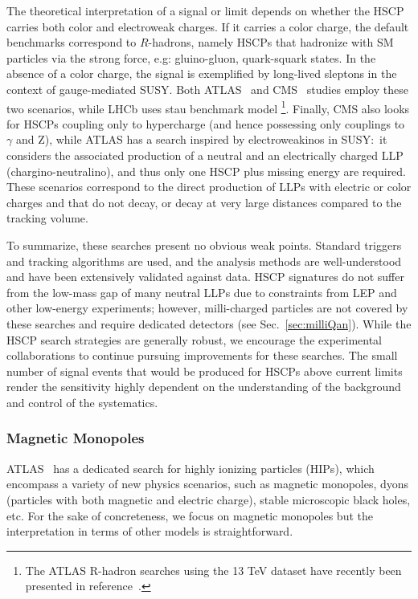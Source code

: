The theoretical interpretation of a signal or limit depends on whether the HSCP carries both color and electroweak charges. If it carries a color charge, the default benchmarks correspond to $R$-hadrons, namely HSCPs that hadronize with SM particles via the strong force, e.g: gluino-gluon, quark-squark states. In the absence of a color charge, the signal is exemplified by long-lived sleptons in the context of gauge-mediated SUSY. Both ATLAS~\cite{ATLAS:2014fka} and CMS~\cite{CMS:2016ybj} studies employ these two scenarios, while LHCb \cite{Aaij:2015ica} uses stau benchmark model \footnote{The ATLAS R-hadron searches using the 13 TeV dataset have recently been presented in reference~\cite{Aaboud:2016uth}. }.
Finally, CMS also looks for HSCPs coupling only to hypercharge (and hence possessing only couplings to $\gamma$ and Z), while ATLAS has a search inspired by electroweakinos in SUSY:~it considers the associated production of a neutral and an electrically charged LLP (chargino-neutralino), and thus only one HSCP plus missing energy are required. These scenarios correspond to the direct production of LLPs with electric or color charges and that do not decay, or decay at very large distances compared to the tracking volume.



To summarize, these searches present no obvious weak points. Standard triggers and tracking algorithms are used, and the analysis methods are well-understood and have been extensively validated against data.  HSCP signatures do not suffer from the low-mass gap of many neutral LLPs due to constraints from LEP and other low-energy experiments; however, milli-charged particles are not covered by these searches and require dedicated detectors (see Sec.~\ref{sec:milliQan}). While the HSCP search strategies are generally robust, we encourage the experimental collaborations to continue pursuing improvements for these searches. The small number of signal events that would be produced for HSCPs above current limits render the sensitivity highly dependent on the understanding of the background and control of the systematics.

\subsubsection*{Magnetic Monopoles} 

ATLAS~\cite{Aad:2015kta} has a dedicated search for highly ionizing particles (HIPs), which encompass a variety of new physics scenarios, such as magnetic monopoles, dyons (particles with both magnetic and electric charge), stable microscopic black holes, etc. For the sake of concreteness, we focus on magnetic monopoles but the interpretation in terms of other models is straightforward.

